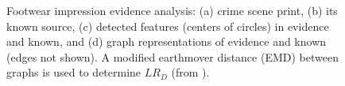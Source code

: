 \documentclass[11pt, doublespacing]{article}
\begin{document}
\begin{figure}
\centering
{}
\caption{\small{Footwear impression evidence analysis: (a) crime scene print,  (b)  its known source, (c) detected features (centers of circles) in evidence and known, and (d)  graph representations of evidence and known (edges not shown).   A modified earthmover distance (EMD) between graphs is used to determine $LR_D$ (from \cite{Srihari2011a,Srihari2014}).}}
\label{fig:Footwear}
\end{figure}
\end{document}
